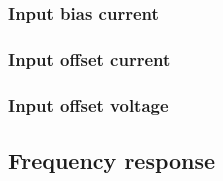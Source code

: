 \subsubsection{Input bias current}


\subsubsection{Input offset current}


\subsubsection{Input offset voltage}


\subsection{Frequency response}

